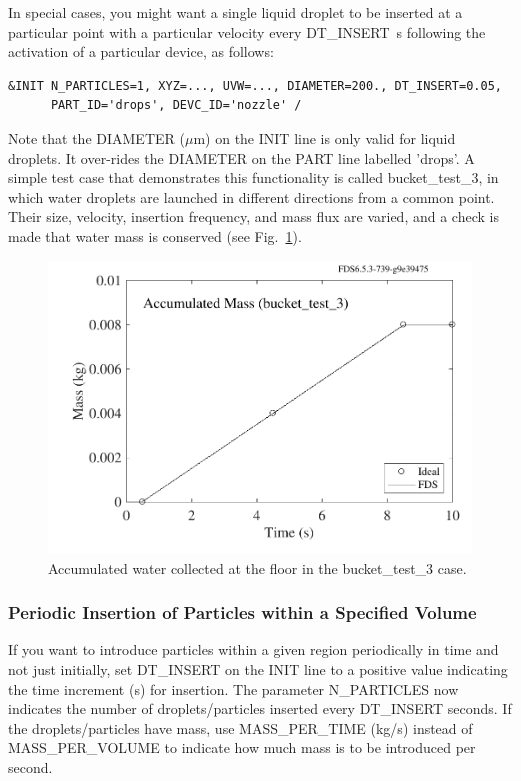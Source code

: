 \documentclass[11pt]{book}
\begin{document}
In special cases, you might want a single liquid droplet to be inserted at a particular point with a particular velocity every {\ct DT\_INSERT}~s following the activation of a particular device, as follows:
\begin{lstlisting}
&INIT N_PARTICLES=1, XYZ=..., UVW=..., DIAMETER=200., DT_INSERT=0.05,
      PART_ID='drops', DEVC_ID='nozzle' /
\end{lstlisting}
Note that the {\ct DIAMETER} ($\mu$m) on the {\ct INIT} line is only valid for liquid droplets. It over-rides the {\ct DIAMETER} on the {\ct PART} line labelled {\ct 'drops'}. A simple test case that demonstrates this functionality is called {\ct bucket\_test\_3}, in which water droplets are launched in different directions from a common point. Their size, velocity, insertion frequency, and mass flux are varied, and a check is made that water mass is conserved (see Fig.~\ref{bucket_test_3_fig}).

\begin{figure}[ht]
\centering
\includegraphics[scale=0.55]{SCRIPT_FIGURES/bucket_test_3}
\caption[Results of the {\ct bucket\_test\_3} case]{Accumulated water collected at the floor in the {\ct bucket\_test\_3} case.}
\label{bucket_test_3_fig}
\end{figure}

\subsubsection{Periodic Insertion of Particles within a Specified Volume}

If you want to introduce particles within a given region periodically in time and not just initially, set {\ct DT\_INSERT} on the {\ct INIT} line to a positive value indicating the time increment (s) for insertion. The parameter {\ct N\_PARTICLES} now indicates the number of droplets/particles inserted every {\ct DT\_INSERT} seconds. If the droplets/particles have mass, use {\ct MASS\_PER\_TIME} (kg/s) instead of {\ct MASS\_PER\_VOLUME} to indicate how much mass is to be introduced per second.
\end{document}
